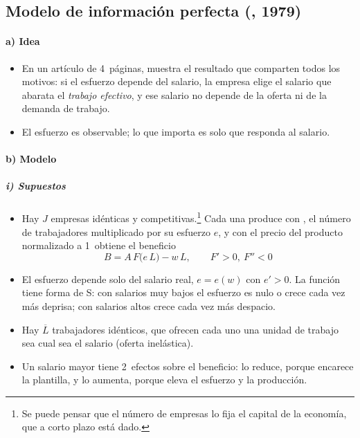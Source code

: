 \documentclass[11pt]{article}
\begin{document}
\subsection{Modelo de información perfecta (, 1979)}\label{sec:solow-1979}

\paragraph{a) Idea}

\begin{itemize}
\item En un artículo de 4~páginas, \textcite{Solow1979Another} muestra el resultado que comparten todos los motivos: si el esfuerzo depende del salario, la empresa elige el salario que abarata el \emph{trabajo efectivo}, y ese salario no depende de la oferta ni de la demanda de trabajo.
\item El esfuerzo es observable; lo que importa es solo que responda al salario.
\end{itemize}

\paragraph{b) Modelo}

\subparagraph{i) Supuestos}

\begin{itemize}
\item Hay $J$ empresas idénticas y competitivas.\footnote{Se puede pensar que el número de empresas lo fija el capital de la economía, que a corto plazo está dado.} Cada una produce con , el número de trabajadores multiplicado por su esfuerzo $e$, y con el precio del producto normalizado a 1~obtiene el beneficio
  \begin{equation}
  B=A\,F\big(e\,L\big)-w\,L,\qquad F'>0,\ F''<0 \label{eq:beneficio-solow}
  \end{equation}
\item El esfuerzo depende solo del salario real, $e=e(w)$ con $e'>0$. La función tiene forma de S: con salarios muy bajos el esfuerzo es nulo o crece cada vez más deprisa; con salarios altos crece cada vez más despacio.
\item Hay $\overline{L}$ trabajadores idénticos, que ofrecen cada uno una unidad de trabajo sea cual sea el salario (oferta inelástica).
\item Un salario mayor tiene 2~efectos sobre el beneficio: lo reduce, porque encarece la plantilla, y lo aumenta, porque eleva el esfuerzo y la producción.
\end{itemize}
\end{document}
